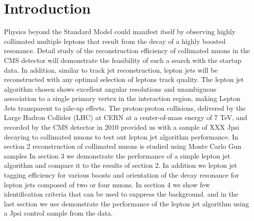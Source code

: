 \section{Introduction}
Physics beyond the Standard Model could manifest itself by observing highly collimated multiple leptons that result from the decay of a highly boosted resonance. Detail study of the reconstruction efficiency of collimated muons in the CMS detector will demonstrate the feasibility of such a search with the startup data. In addition, similar to track jet reconstruction, lepton jets will be reconstructed with any optimal selection of leptons track quality.
The lepton jet algorithm chosen shows excellent angular resolutions and unambiguous association to a single primary vertex in the interaction region, making Lepton Jets transparent to pile-up effects.
The proton-proton collisions, delivered by the Large Hadron Collider (LHC) at CERN at a center-of-mass energy  of 7 TeV, and recorded by the CMS detector in 2010 provided us with a sample of XXX Jpsi decaying to collimated muons to test out lepton jet algorithm performance.
In section 2 reconstruction of collimated muons is studied using Monte Carlo Gun samples In section 3 we demonstrate the performance of a simple lepton jet algorithm and compare it to the results of section 2. In addition we lepton jet tagging efficiency for various boosts and orientation of the decay resonance for lepton jets composed of two or four muons. In section 4 we show few identification criteria that can be used to suppress the background.
and in the last section we use demonstrate the performance of the lepton jet algorithm using a Jpsi control sample from the data.



